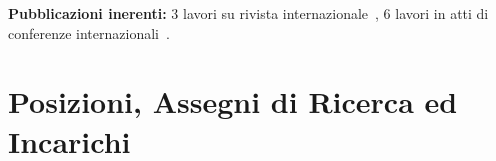 \documentclass[11pt]{article}
\begin{document}


\textbf{Pubblicazioni inerenti:}
3 lavori su rivista internazionale~\cite{galasso2019rcim, kallasi2017ras, cigolini2014jamris},
6 lavori in atti di conferenze internazionali~\cite{lodirizzini2022raad, amoretti2020smartsys, valeriani2013acra, lodirizzini2012icinco, calo2012icinco, argenti2010isr, lodirizzini2021simai, cerri2007ccmvs}.



\section*{Posizioni, Assegni di Ricerca ed Incarichi}
\end{document}
